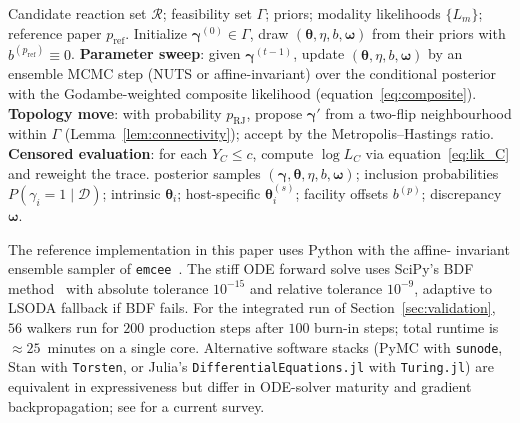 \documentclass[12pt]{article}
\theoremstyle{plain}
\theoremstyle{definition}
\theoremstyle{remark}
\newcommand{\HBMAE}{HBMAE\xspace}
\begin{document}
\begin{algorithm}[ht]
\caption{\HBMAE\ constrained-hierarchical-censored RJ-MCMC}\label{alg:hbmae}
\begin{algorithmic}[1]
\Require Candidate reaction set $\mathcal{R}$; feasibility set $\Gamma$; priors;
         modality likelihoods $\{L_m\}$; reference paper $p_{\mathrm{ref}}$.
\State Initialize $\boldsymbol\gamma^{(0)}\in\Gamma$, draw
       $(\boldsymbol\theta, \eta, b, \boldsymbol\omega)$ from their priors with
       $b^{(p_{\mathrm{ref}})}\equiv 0$.
  \State \textbf{Parameter sweep}: given $\boldsymbol\gamma^{(t-1)}$, update
         $(\boldsymbol\theta, \eta, b, \boldsymbol\omega)$ by an ensemble MCMC
         step (NUTS or affine-invariant) over the conditional posterior with
         the Godambe-weighted composite likelihood
         (equation~\eqref{eq:composite}).
  \State \textbf{Topology move}: with probability $p_{\mathrm{RJ}}$, propose
         $\boldsymbol\gamma'$ from a two-flip neighbourhood within $\Gamma$
         (Lemma~\ref{lem:connectivity}); accept by the
         Metropolis--Hastings ratio.
  \State \textbf{Censored evaluation}: for each $Y_C \le c$, compute
         $\log L_C$ via equation~\eqref{eq:lik_C} and reweight the trace.
\EndFor
\State \Return posterior samples $(\boldsymbol\gamma, \boldsymbol\theta, \eta,
       b, \boldsymbol\omega)$; inclusion probabilities $P(\gamma_i=1\mid\mathcal{D})$;
       intrinsic $\boldsymbol\theta_i$; host-specific $\boldsymbol\theta_i^{(s)}$;
       facility offsets $b^{(p)}$; discrepancy $\boldsymbol\omega$.
\end{algorithmic}
\end{algorithm}

The reference implementation in this paper uses Python with the affine-
invariant ensemble sampler of \texttt{emcee}~\citep{ForemanMackey2013}.
The stiff ODE forward solve uses SciPy's BDF method~\citep{Hindmarsh2005}
with absolute tolerance $10^{-15}$ and relative tolerance $10^{-9}$,
adaptive to LSODA fallback if BDF fails.  For the integrated run of
Section~\ref{sec:validation}, $56$ walkers run for $200$ production steps
after $100$ burn-in steps; total runtime is $\approx 25$~minutes on a
single core.  Alternative software stacks (PyMC with \texttt{sunode},
Stan with \texttt{Torsten}, or Julia's \texttt{DifferentialEquations.jl}
with \texttt{Turing.jl}) are equivalent in expressiveness but differ in
ODE-solver maturity and gradient backpropagation; see
\citet{SciML2024} for a current survey.
\end{document}
